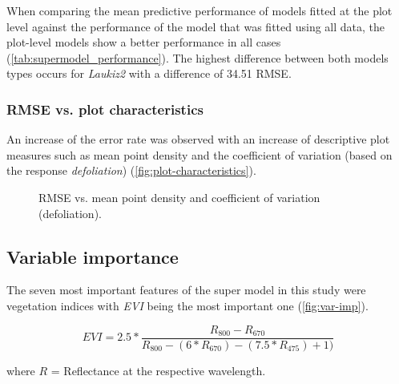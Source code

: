 \documentclass[review]{elsarticle}
\begin{document}
When comparing the mean predictive performance of models fitted at the plot level against the performance of the model that was fitted using all data, the plot-level models show a better performance in all cases (\autoref{tab:supermodel_performance}).
The highest difference between both models types occurs for \textit{Laukiz2} with a difference of 34.51 RMSE.

\subsubsection{RMSE vs. plot characteristics}

\noindent An increase of the error rate was observed with an increase of descriptive plot measures such as mean point density and the coefficient of variation (based on the response \textit{defoliation}) (\autoref{fig:plot-characteristics}).

\begin{figure} [b!]
	\begin{center}
		\caption{RMSE vs. mean point density and coefficient of variation (defoliation).}
		\label{fig:plot-characteristics}
	\end{center}
\end{figure}

\subsection{Variable importance}

\noindent The seven most important features of the super model in this study were vegetation indices with \textit{EVI} \citep{hueteComparisonVegetationIndices1997} being the most important one (\autoref{fig:var-imp}).

\begin{equation}
	EVI = 2.5*\frac{R_{800}-R_{670}}{R_{800}-(6*R_{670})-(7.5*R_{475})+1)}
\end{equation}

\noindent where $R$ = Reflectance at the respective wavelength.
\end{document}
